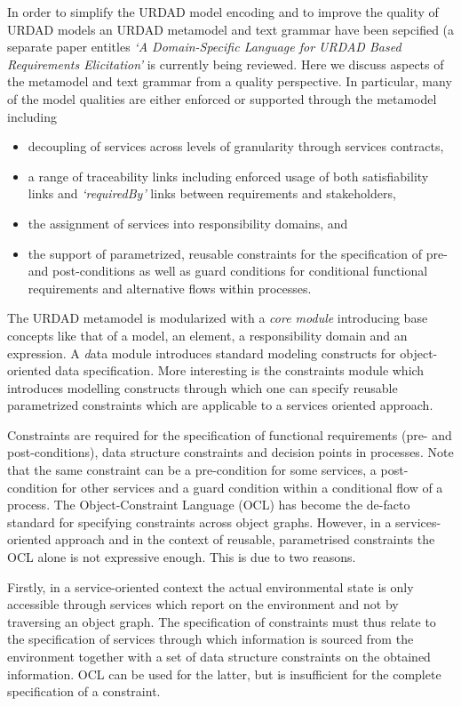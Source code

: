 In order to simplify the URDAD model encoding and to improve the quality of URDAD models an URDAD metamodel and text grammar have been sepcified (a separate paper entitles \emph{`A Domain-Specific Language for URDAD Based Requirements Elicitation'} is currently being reviewed. Here we discuss aspects of the metamodel and text grammar from a quality perspective. In particular, many of the model qualities are either enforced or supported through the metamodel including
\begin{itemize}
 \item decoupling of services across levels of granularity through services contracts,
 \item a range of traceability links including enforced usage of both satisfiability links and \emph{`requiredBy'} links between requirements and stakeholders,
 \item the assignment of services into responsibility domains, and 
 \item the support of parametrized, reusable constraints for the specification of pre- and post-conditions as well as guard conditions for conditional functional requirements and alternative flows within processes.
\end{itemize}

The URDAD metamodel is modularized with a \emph{core module} introducing base concepts like that of a model, an element, a responsibility domain and an expression. A {\emph data module} introduces standard modeling constructs for object-oriented data specification. More interesting is the constraints module which introduces modelling constructs through which one can specify reusable parametrized constraints which are applicable to a services oriented approach.

Constraints are required for the specification of functional requirements (pre- and post-conditions), data structure constraints and decision points in processes. Note that the same constraint can be a pre-condition for some services, a post-condition for other services and a guard condition within a conditional flow of a process. The Object-Constraint Language (OCL)\cite{_object_2010}  has become the de-facto standard for specifying constraints across object graphs. However, in a services-oriented approach and in the context of reusable, parametrised constraints the OCL alone is not expressive enough. This is due to two reasons.

Firstly, in a service-oriented context the actual environmental state is only accessible through services which report on the environment and not by traversing an object graph. The specification of constraints must thus relate to the specification of services through which information is sourced from the environment together with a set of data structure constraints on the obtained information. OCL can be used for the latter, but is insufficient for the complete specification of a constraint.

